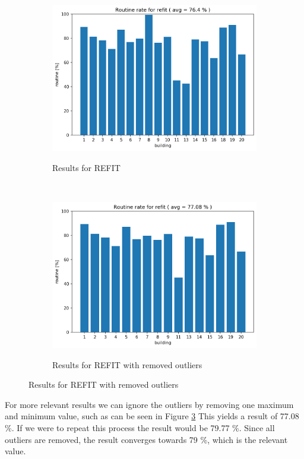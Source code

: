 \begin{figure}[H]
	\begin{subfigure}{.5\textwidth}
        \caption{Results for REFIT}
        \includegraphics[width=1\textwidth]{Figures/EC/refit_res.png}
        \label{fig:refit_res}
    \end{subfigure}
    ~
    \begin{subfigure}{.5\textwidth}
        \caption{Results for REFIT with removed outliers}
        \includegraphics[width=1\textwidth]{Figures/EC/refit_res2.png}
        \label{fig:refit_res2}
    \end{subfigure}
\end{figure}

For more relevant results we can ignore the outliers by removing one maximum and minimum value, such as can be seen in Figure \ref{fig:refit_res2}
This yields a result of 77.08 \%.
If we were to repeat this process the result would be 79.77 \%.
Since all outliers are removed, the result converges towards 79 \%, which is the relevant value. 


